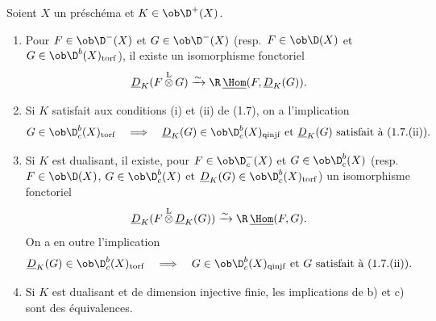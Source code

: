 \begin{proposition}[cf.~{\upshape [H]~V~2.6}]
Soient $X$ un préschéma et $K \in \ob \D^{+}(X)$.
\begin{enumerate}
\item[a)] Pour $F \in \ob \D^{-}(X)$ et $G \in \ob \D^{-}(X)$ (resp.~$F \in \ob \D(X)$ et $G \in \ob \D^{b}(X)_{\mathrm{torf}}$), il existe un isomorphisme fonctoriel
\[
\underline{D}_K(F \mathop{\otimes}\limits^{\mathrm{L}} G) \xrightarrow{\sim} \R\,\underline{\Hom}(F, \underline{D}_K(G)).
\]
\item[b)] Si $K$ satisfait aux conditions (i) et (ii) de (1.7), on a l'implication
\[
G \in \ob \D_c^{b}(X)_{\mathrm{torf}} \quad \Longrightarrow \quad \underline{D}_K(G) \in \ob \D_c^{b}(X)_{\mathrm{qinjf}} \text{ et } \underline{D}_K(G) \text{ satisfait à (1.7.(ii)).}
\]
\item[c)] Si $K$ est dualisant, il existe, pour $F \in \ob \D_c^{-}(X)$ et $G \in \ob \D_c^{b}(X)$ (resp.~$F \in \ob \D(X)$, $G \in \ob \D_c^{b}(X)$ et $\underline{D}_K(G) \in \ob \D_c^{b}(X)_{\mathrm{torf}}$) un isomorphisme fonctoriel
\[
\underline{D}_K(F \mathop{\otimes}\limits^{\mathrm{L}} \underline{D}_K(G)) \xrightarrow{\sim} \R\,\underline{\Hom}(F, G).
\]
On a en outre l'implication
\[
\underline{D}_K(G) \in \ob \D_c^{b}(X)_{\mathrm{torf}} \quad \Longrightarrow \quad G \in \ob \D_c^{b}(X)_{\mathrm{qinjf}} \text{ et } G \text{ satisfait à (1.7.(ii)).}
\]
\item[d)] Si $K$ est dualisant et de dimension injective finie, les implications de b) et c) sont des équivalences.
\end{enumerate}
\end{proposition}

